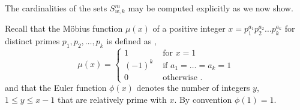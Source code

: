 The cardinalities of the sets $S_{w,k}^m$ may be computed
explicitly as we now show.

Recall that the M\"{o}bius function $\mu(x)$ of a positive integer
$x=p_1^{a_1}p_2^{a_2}\dots p_k^{a_k}$ for distinct primes
$p_1,p_2,\dots,p_k$ is defined as \cite{apostol},
\begin{equation}
\mu(x)=\left\{ \begin{array}{lll} 1 &\text{ for }x=1\\
(-1)^k &\text{ if }a_1=\dots=a_k=1\\
0 &\text{ otherwise }.
\end{array}\right.
\end{equation}and that the Euler function $\phi(x)$ denotes the number of
integers $y$, $1 \leq y \leq x-1$ that are relatively prime with
$x$. By convention $\phi(1)=1$.

